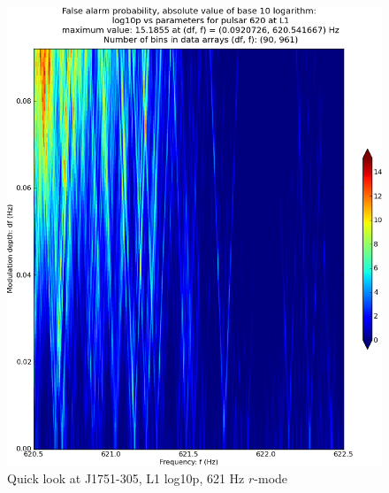 \begin{figure}
\begin{center}
\includegraphics[width=0.4\paperwidth,height=0.2\paperheight]{plots/DFvsFresultsProb-L1_pulsar-620.eps}
\caption{
Quick look at J1751-305, L1 log10p, 621 Hz $r$-mode}
\end{center}
\end{figure}





